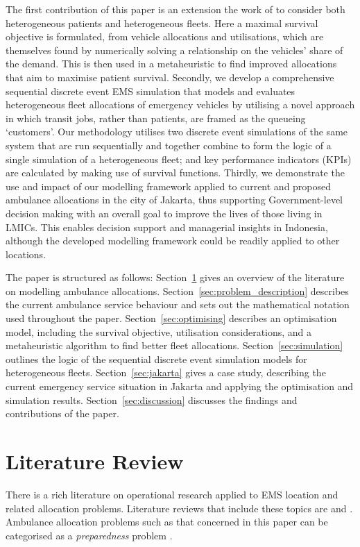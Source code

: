 \documentclass[numbers,webpdf,imaman]{ima-authoring-template}%
\begin{document}
The first contribution of this paper is an extension the work of
\citet{Knight2012918} to consider both heterogeneous patients and heterogeneous
fleets. Here a maximal survival objective is formulated, from vehicle
allocations and utilisations, which are themselves found by numerically
solving a relationship on the vehicles' share of the demand. This is then used
in a metaheuristic to find improved allocations that aim to maximise patient
survival.
Secondly, we develop a comprehensive sequential discrete event EMS
simulation that models and evaluates heterogeneous fleet allocations of
emergency vehicles by utilising a novel approach in which transit jobs, rather
than patients, are framed as the queueing `customers'. Our methodology
utilises two discrete event simulations of the same system that are run
sequentially and together combine to form the logic of a single simulation of
a heterogeneous fleet; and key performance indicators (KPIs) are calculated by
making use of survival functions.
Thirdly, we demonstrate the use and impact of our modelling framework applied
to current and proposed ambulance allocations in the city of Jakarta, thus
supporting Government-level decision making with an overall goal to improve
the lives of those living in LMICs. This enables decision support and
managerial insights in Indonesia, although the developed modelling framework
could be readily applied to other locations.

The paper is structured as follows:
Section~\ref{sec:litreview} gives an overview of the literature on modelling
ambulance allocations.
Section~\ref{sec:problem_description} describes the current ambulance service
behaviour and sets out the mathematical notation used throughout the paper.
Section~\ref{sec:optimising} describes an
optimisation model, including the survival objective, utilisation
considerations, and a metaheuristic algorithm to find better fleet allocations.
Section~\ref{sec:simulation} outlines the logic of the sequential discrete
event simulation models for heterogeneous fleets.
Section~\ref{sec:jakarta} gives a case study, describing the current emergency
service situation in Jakarta and applying the optimisation and simulation
results.
Section~\ref{sec:discussion} discusses the findings and contributions of the
paper.



\section{Literature Review}\label{sec:litreview}
There is a rich literature on operational research applied to EMS location and
related allocation problems. Literature reviews that include these topics are
\citet{aringhieri2017emergency, belanger2019recent, farahani2019or, Li2011, Liu2021, reuter2017logistics, mukhopadhyay22}
and \citet{wang2021emergency}. Ambulance allocation problems such as that
concerned in this paper can be categorised as a \textit{preparedness}
problem \citep{mukhopadhyay22}.
\end{document}
